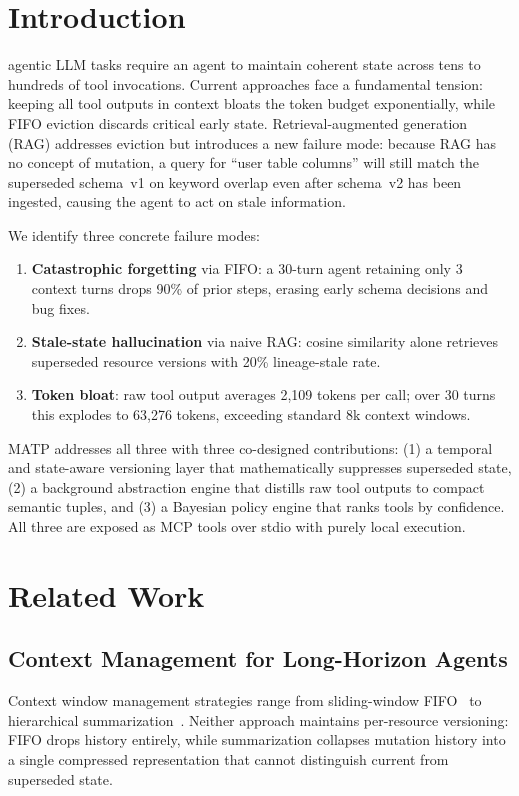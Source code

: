 \documentclass[lettersize,journal]{IEEEtran}
\begin{document}
\section{Introduction}
 agentic LLM tasks require an agent to maintain coherent state across tens to hundreds of tool invocations. Current approaches face a fundamental tension: keeping all tool outputs in context bloats the token budget exponentially, while FIFO eviction discards critical early state. Retrieval-augmented generation (RAG) addresses eviction but introduces a new failure mode: because RAG has no concept of mutation, a query for ``user table columns'' will still match the superseded schema~v1 on keyword overlap even after schema~v2 has been ingested, causing the agent to act on stale information.

We identify three concrete failure modes:

\begin{enumerate}
    \item \textbf{Catastrophic forgetting} via FIFO: a 30-turn agent retaining only 3 context turns drops 90\% of prior steps, erasing early schema decisions and bug fixes.
    \item \textbf{Stale-state hallucination} via naive RAG: cosine similarity alone retrieves superseded resource versions with 20\% lineage-stale rate.
    \item \textbf{Token bloat}: raw tool output averages 2,109 tokens per call; over 30 turns this explodes to 63,276 tokens, exceeding standard 8k context windows.
\end{enumerate}

MATP addresses all three with three co-designed contributions: (1) a temporal and state-aware versioning layer that mathematically suppresses superseded state, (2) a background abstraction engine that distills raw tool outputs to compact semantic tuples, and (3) a Bayesian policy engine that ranks tools by confidence. All three are exposed as MCP tools over stdio with purely local execution.

\section{Related Work}

\subsection{Context Management for Long-Horizon Agents}
Context window management strategies range from sliding-window FIFO~\cite{shinn2023reflexion} to hierarchical summarization~\cite{park2023generative}. Neither approach maintains per-resource versioning: FIFO drops history entirely, while summarization collapses mutation history into a single compressed representation that cannot distinguish current from superseded state.
\end{document}
